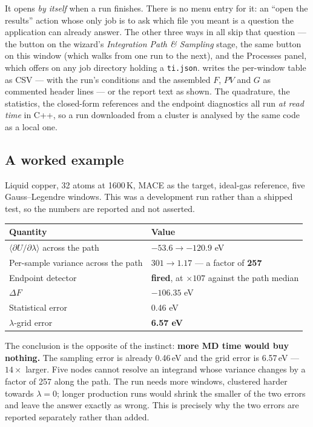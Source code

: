 It opens \emph{by itself} when a run finishes. There is no menu entry for it:
an ``open the results'' action whose only job is to ask which file you meant is
a question the application can already answer. The other three ways in all skip
that question --- the  button on the wizard's
\emph{Integration Path \& Sampling} stage, the same button on this window
(which walks from one run to the next), and the Processes panel, which offers
 on any job directory holding a
\texttt{ti.json}.  writes the per-window table as
CSV --- with the run's conditions and the assembled $F$, $PV$ and $G$ as
commented header lines --- or the report text as shown. The quadrature, the statistics,
the closed-form references and the endpoint diagnostics all run \emph{at read
time} in C++, so a run downloaded from a cluster is analysed by the same code as
a local one.

\subsection{A worked example}

Liquid copper, 32 atoms at 1600\,K, MACE as the target, ideal-gas reference,
five Gauss--Legendre windows. This was a development run rather than a shipped
test, so the numbers are reported and not asserted.

\begin{center}
\small
\begin{tabular}{@{}lp{7.6cm}@{}}
\toprule
Quantity & Value \\
\midrule
$\langle\partial U/\partial\lambda\rangle$ across the path & $-53.6 \to -120.9$ eV \\
Per-sample variance across the path & $301 \to 1.17$ --- a factor of \textbf{257} \\
Endpoint detector & \textbf{fired}, at $\times 107$ against the path median \\
$\Delta F$ & $-106.35$ eV \\
Statistical error & 0.46 eV \\
$\lambda$-grid error & \textbf{6.57 eV} \\
\bottomrule
\end{tabular}
\end{center}

The conclusion is the opposite of the instinct: \textbf{more MD time would buy
nothing.} The sampling error is already 0.46\,eV and the grid error is
6.57\,eV --- $14\times$ larger. Five nodes cannot resolve an integrand whose
variance changes by a factor of 257 along the path. The run needs more windows,
clustered harder towards $\lambda = 0$; longer production runs would shrink the
smaller of the two errors and leave the answer exactly as wrong. This is
precisely why the two errors are reported separately rather than added.

